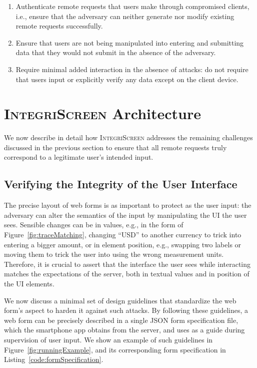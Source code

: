 \documentclass[sigconf, anonymous, balance=false]{acmart}
\newcommand{\app}{smartphone app\xspace}
\newcommand{\sysname}{\textsc{IntegriScreen}\xspace}
\begin{document}
\begin{enumerate}[leftmargin=*]
	\item Authenticate remote requests that users make through compromised clients, i.e., ensure that the adversary can neither generate nor modify existing remote requests successfully.

	\item Ensure that users are not being manipulated into entering and submitting data that they would not submit in the absence of the adversary.

	\item Require minimal added interaction in the absence of attacks: do not require that users input or explicitly verify any data except on the client device.
\end{enumerate}


\section{\sysname Architecture} \label{sec:hardenUI}

We now describe in detail how \sysname addresses the remaining challenges discussed in the previous section to ensure that all remote requests truly correspond to a legitimate user's intended input.


\subsection{Verifying the Integrity of the User Interface}
\label{sec:systemDesign:webpage}

The precise layout of web forms is as important to protect as the user input: the adversary can alter the semantics of the input by manipulating the UI the user sees.
Sensible changes can be in values, e.g., in the form of Figure~\ref{fig:traceMatching}, changing ``USD'' to another currency to trick into entering a bigger amount, or in element position, e.g., swapping two labels or moving them to trick the user into using the wrong measurement units.
Therefore, it is crucial to assert that the interface the user sees while interacting matches the expectations of the server, both in textual values and in position of the UI elements.

We now discuss a minimal set of design guidelines that standardize the web form's aspect to harden it against such attacks.
By following these guidelines, a web form can be precisely described in a single JSON form specification file, which the \app obtains from the server, and uses as a guide during supervision of user input.
We show an example of such guidelines in Figure~\ref{fig:runningExample}, and its corresponding form specification in Listing~\ref{code:formSpecification}.
\end{document}
